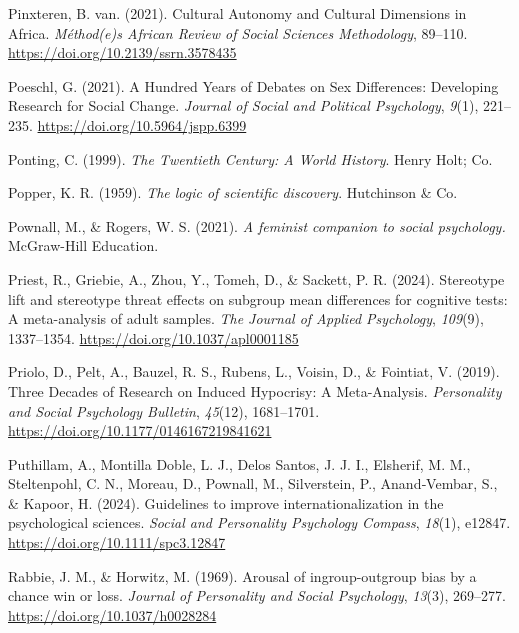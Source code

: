 \documentclass[
  letterpaper,
]{book}
\newlength{\cslhangindent}
\newenvironment{CSLReferences}[2] %
 {\begin{list}{}{%
  \setlength{\itemindent}{0pt}
  \setlength{\leftmargin}{0pt}
  \setlength{\parsep}{0pt}
  \ifodd #1
   \setlength{\leftmargin}{\cslhangindent}
   \setlength{\itemindent}{-1\cslhangindent}
  \fi
  \setlength{\itemsep}{#2\baselineskip}}}
 {\end{list}}
\begin{document}
\begin{CSLReferences}{1}{0}
Pinxteren, B. van. (2021). Cultural {Autonomy} and {Cultural}
{Dimensions} in {Africa}. \emph{Méthod(e)s African Review of Social
Sciences Methodology}, 89--110.
\url{https://doi.org/10.2139/ssrn.3578435}

Poeschl, G. (2021). A {Hundred} {Years} of {Debates} on {Sex}
{Differences}: {Developing} {Research} for {Social} {Change}.
\emph{Journal of Social and Political Psychology}, \emph{9}(1),
221--235. \url{https://doi.org/10.5964/jspp.6399}

Ponting, C. (1999). \emph{The {Twentieth} {Century}: {A} {World}
{History}}. Henry Holt; Co.

Popper, K. R. (1959). \emph{The logic of scientific discovery}.
Hutchinson \& Co.

Pownall, M., \& Rogers, W. S. (2021). \emph{A feminist companion to
social psychology.} McGraw-Hill Education.

Priest, R., Griebie, A., Zhou, Y., Tomeh, D., \& Sackett, P. R. (2024).
Stereotype lift and stereotype threat effects on subgroup mean
differences for cognitive tests: {A} meta-analysis of adult samples.
\emph{The Journal of Applied Psychology}, \emph{109}(9), 1337--1354.
\url{https://doi.org/10.1037/apl0001185}

Priolo, D., Pelt, A., Bauzel, R. S., Rubens, L., Voisin, D., \&
Fointiat, V. (2019). {Three Decades of Research on Induced Hypocrisy: A
Meta-Analysis}. \emph{{Personality and Social Psychology Bulletin}},
\emph{45}(12), 1681--1701.
\url{https://doi.org/10.1177/0146167219841621}

Puthillam, A., Montilla Doble, L. J., Delos Santos, J. J. I., Elsherif,
M. M., Steltenpohl, C. N., Moreau, D., Pownall, M., Silverstein, P.,
Anand‐Vembar, S., \& Kapoor, H. (2024). Guidelines to improve
internationalization in the psychological sciences. \emph{Social and
Personality Psychology Compass}, \emph{18}(1), e12847.
\url{https://doi.org/10.1111/spc3.12847}

Rabbie, J. M., \& Horwitz, M. (1969). Arousal of ingroup-outgroup bias
by a chance win or loss. \emph{Journal of Personality and Social
Psychology}, \emph{13}(3), 269--277.
\url{https://doi.org/10.1037/h0028284}


\end{CSLReferences}
\end{document}
